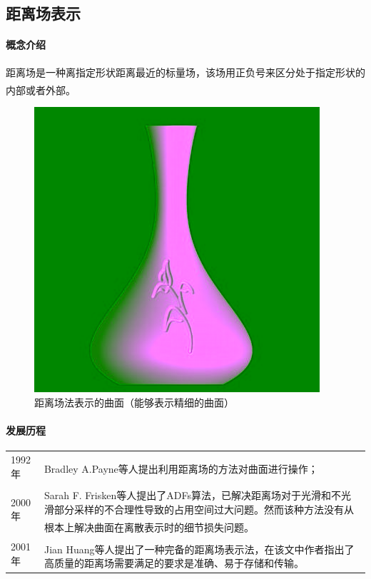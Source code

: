 \documentclass[11pt]{article}
\newcommand{\upcite}[1]{\textsuperscript{\textsuperscript{\cite{#1}}}}
\begin{document}
\subsection{距离场表示} 
\paragraph{概念介绍} \mbox{}
\par 距离场是一种离指定形状距离最近的标量场，该场用正负号来区分处于指定形状的内部或者外部\upcite{DF2}。
\begin{figure}[H]
\begin{center}
\includegraphics[scale=0.6]{DF.png}
\caption{距离场法表示的曲面（能够表示精细的曲面）}
\end{center}
\end{figure}

\paragraph{发展历程} \mbox{}
\begin{table}[H]
\begin{tabular}{ll}
1992年& Bradley A.Payne等人提出利用距离场的方法对曲面进行操作\upcite{DF1}；\\
2000年&Sarah F. Frisken等人提出了ADFs算法\upcite{DF2}，已解决距离场对于光滑和不光滑部分采样的不合理性导致的占用空间过大问题。然而该种方法没有从根本上解决曲面在离散表示时的细节损失问题\upcite{DF3}。\\
2001年&Jian Huang等人提出了一种完备的距离场表示法\upcite{DF3}，在该文中作者指出了高质量的距离场需要满足的要求是准确、易于存储和传输。
\end{tabular}
\end{table}
\end{document}
